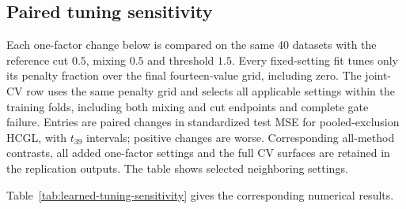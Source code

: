 \documentclass[11pt,a4paper]{article}
\begin{document}
\FloatBarrier
\subsection{Paired tuning sensitivity}\label{app:learned-tuning}
Each one-factor change below is compared on the same 40 datasets with the reference
cut $0.5$, mixing $0.5$ and threshold $1.5$. Every fixed-setting fit tunes only its
penalty fraction over the final fourteen-value grid, including zero. The joint-CV
row uses the same penalty grid and selects all applicable settings within the
training folds, including both mixing and cut endpoints and complete gate failure.
Entries are paired changes in standardized test MSE for pooled-exclusion
HCGL, with $t_{39}$ intervals; positive changes are worse. Corresponding all-method
contrasts, all added one-factor settings and the full CV surfaces are retained
in the replication outputs. The table shows selected neighboring settings.

\noindent Table~\ref{tab:learned-tuning-sensitivity} gives the corresponding numerical results.
\end{document}
